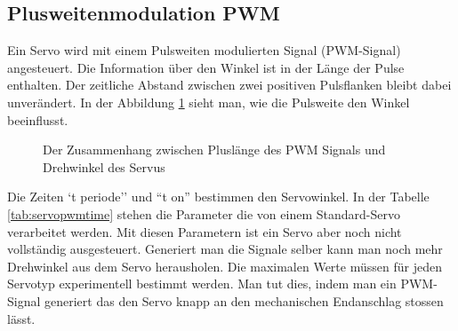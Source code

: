 \subsection{Plusweitenmodulation PWM}

Ein Servo wird mit einem Pulsweiten modulierten Signal (PWM-Signal) angesteuert. Die Information 
über den Winkel ist in der Länge der Pulse enthalten. Der zeitliche Abstand zwischen zwei positiven
Pulsflanken bleibt dabei unverändert. In der Abbildung \ref{fig:pwm} sieht man, wie die Pulsweite 
den Winkel beeinflusst.
\begin{figure}[htbp]
\begin{center}


\caption{Der Zusammenhang zwischen Pluslänge des PWM Signals und Drehwinkel des Servus}
\label{fig:pwm}
\end{center}
\end{figure}

Die Zeiten `t periode'' und ``t on'' bestimmen den Servowinkel. In der  Tabelle 
\ref{tab:servopwmtime} stehen die Parameter die von einem Standard-Servo verarbeitet werden. 
Mit diesen Parametern ist ein Servo aber noch nicht vollständig ausgesteuert. Generiert man 
die Signale selber kann man noch mehr Drehwinkel aus dem Servo herausholen. Die maximalen 
Werte müssen für jeden Servotyp experimentell bestimmt werden. Man tut dies, indem man ein 
PWM-Signal generiert das den Servo knapp an den mechanischen Endanschlag stossen lässt. 

